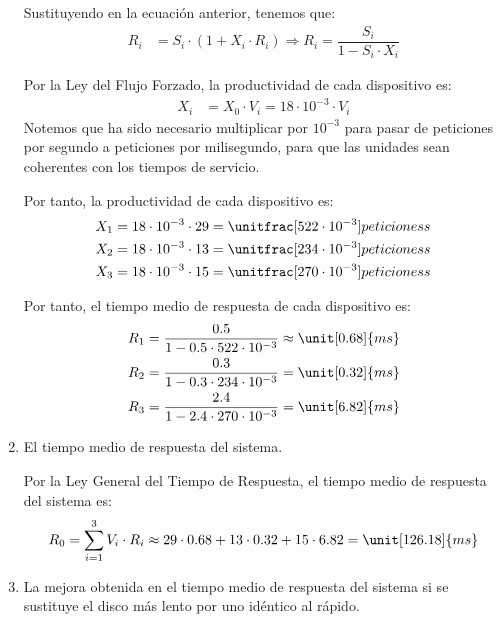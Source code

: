 \begin{ejercicio}
\begin{enumerate}
        Sustituyendo en la ecuación anterior, tenemos que:
        \begin{align*}
            R_i &= S_i \cdot (1 + X_i \cdot R_i)
            \Longrightarrow R_i = \dfrac{S_i}{1 - S_i \cdot X_i}
        \end{align*}

        Por la Ley del Flujo Forzado, la productividad de cada dispositivo es:
        \begin{align*}
            X_i &= X_0 \cdot V_i = 18\cdot 10^{-3} \cdot V_i
        \end{align*}
        Notemos que ha sido necesario multiplicar por $10^{-3}$ para pasar de peticiones por segundo a peticiones por milisegundo, para que las unidades sean coherentes con los tiempos de servicio.

        Por tanto, la productividad de cada dispositivo es:
        \begin{align*}
            X_1 &= 18\cdot 10^{-3} \cdot 29 = \unitfrac[522\cdot 10^{-3}]{peticiones}{s} \\
            X_2 &= 18\cdot 10^{-3} \cdot 13 = \unitfrac[234\cdot 10^{-3}]{peticiones}{s} \\
            X_3 &= 18\cdot 10^{-3} \cdot 15 = \unitfrac[270\cdot 10^{-3}]{peticiones}{s}
        \end{align*}

        Por tanto, el tiempo medio de respuesta de cada dispositivo es:
        \begin{align*}
            R_1 &= \dfrac{0.5}{1 - 0.5 \cdot 522\cdot 10^{-3}} \approx \unit[0.68]{ms} \\
            R_2 &= \dfrac{0.3}{1 - 0.3 \cdot 234\cdot 10^{-3}} = \unit[0.32]{ms} \\
            R_3 &= \dfrac{2.4}{1 - 2.4 \cdot 270\cdot 10^{-3}} = \unit[6.82]{ms}
        \end{align*}
        \item El tiempo medio de respuesta del sistema.
        
        Por la Ley General del Tiempo de Respuesta, el tiempo medio de respuesta del sistema es:
        \begin{equation*}
            R_0 = \sum_{i=1}^{3} V_i \cdot R_i \approx 29 \cdot 0.68 + 13 \cdot 0.32 + 15 \cdot 6.82 = \unit[126.18]{ms}
        \end{equation*}
        \item La mejora obtenida en el tiempo medio de respuesta del sistema si se sustituye el disco más lento por uno idéntico al rápido.
        

\end{enumerate}
\end{ejercicio}
